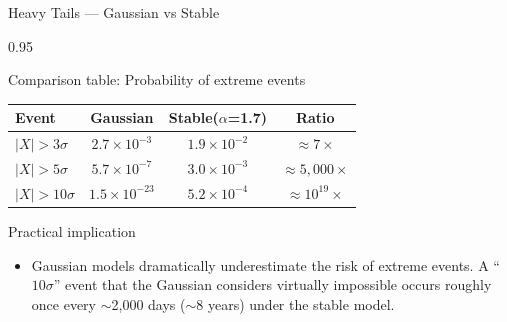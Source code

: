 \documentclass[9pt, aspectratio=169, t]{beamer}
\begin{document}
\begin{frame}{Heavy Tails --- Gaussian vs Stable}
    \begin{cminipage}{0.95\textwidth}

\begin{block}{Comparison table: Probability of extreme events}
\renewcommand{\arraystretch}{1.3}
\begin{center}
\begin{tabular}{lccc}
\toprule
\textbf{Event} & \textbf{Gaussian} & \textbf{Stable($\alpha$=1.7)} & \textbf{Ratio} \\
\midrule
$|X| > 3\sigma$ & $2.7 \times 10^{-3}$ & $1.9 \times 10^{-2}$ & $\approx 7\times$ \\
$|X| > 5\sigma$ & $5.7 \times 10^{-7}$ & $3.0 \times 10^{-3}$ & $\approx 5{,}000\times$ \\
$|X| > 10\sigma$ & $1.5 \times 10^{-23}$ & $5.2 \times 10^{-4}$ & $\approx 10^{19}\times$ \\
\bottomrule
\end{tabular}
\end{center}
\end{block}

\begin{alertblock}{Practical implication}
\begin{itemize}\setlength{\itemsep}{0pt}
    \item Gaussian models dramatically underestimate the risk of extreme events. A ``$10\sigma$'' event that the Gaussian considers virtually impossible occurs roughly once every $\sim$2{,}000 days ($\sim$8 years) under the stable model.
\end{itemize}
\end{alertblock}
    \end{cminipage}
\end{frame}
\end{document}
